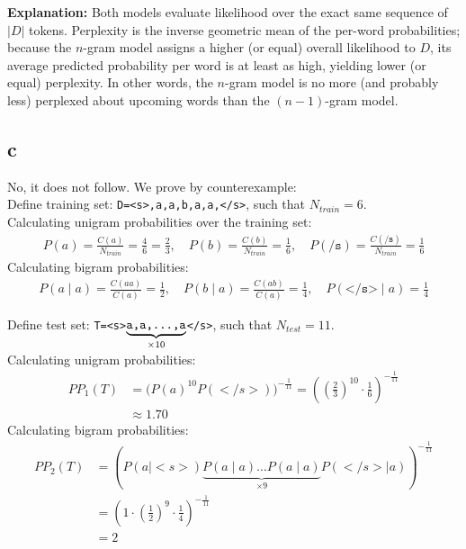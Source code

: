 \documentclass{article}
\numberwithin{equation}{section}
\begin{document}
    \noindent \textbf{Explanation:} Both models evaluate likelihood over the exact same sequence of $|D|$ tokens. Perplexity is the inverse geometric mean of the per-word probabilities; because the $n$-gram model assigns a higher (or equal) overall likelihood to $D$, its average predicted probability per word is at least as high, yielding lower (or equal) perplexity. In other words, the $n$-gram model is no more (and probably less) perplexed about upcoming words than the $(n-1)$-gram model.

    \subsection*{c}
    No, it does not follow.
    We prove by counterexample: \\

    Define training set: \texttt{D=<s>,a,a,b,a,a,</s>}, such that $N_{train} = 6$.\\
    Calculating unigram probabilities over the training set:
    \begin{align*}
        P(a) = \frac{C(a)}{N_{train}} = \frac{4}{6} = \frac{2}{3}, \quad
        P(b) = \frac{C(b)}{N_{train}} = \frac{1}{6}, \quad
        P(\texttt{/s}) = \frac{C(\texttt{/s})}{N_{train}} = \frac{1}{6}
    \end{align*}
    Calculating bigram probabilities:
    \begin{align*}
        P(a \mid a) = \frac{C(aa)}{C(a)} = \frac{1}{2}, \quad
        P(b \mid a) = \frac{C(ab)}{C(a)} = \frac{1}{4}, \quad
        P(\texttt{</s>} \mid a) = \frac{1}{4}
    \end{align*}

    Define test set: \texttt{T=<s>$\underbrace{\texttt{a,a,\dots,a}}_{\times 10}$</s>}, such that $N_{test}=11$. \\
    Calculating unigram probabilities:
    \begin{align*}
        PP_{1}(T) &= \big(P(a)^{10} P(</s>)\big)^{-\frac{1}{11}}
            = ((\frac{2}{3})^{10} \cdot \frac{1}{6})^{-\frac{1}{11}} \\
            & \approx 1.70
    \end{align*}
    Calculating bigram probabilities:
    \begin{align*}
        PP_{2}(T) &= (P(a \mid <s>)\underbrace{P(a \mid a) \dots P(a \mid a)}_{\times 9}P(</s> \mid a))^{-\frac{1}{11}} \\
            &= (1 \cdot (\frac{1}{2})^9 \cdot \frac{1}{4})^{-\frac{1}{11}} \\
            &= 2
    \end{align*}
\end{document}
